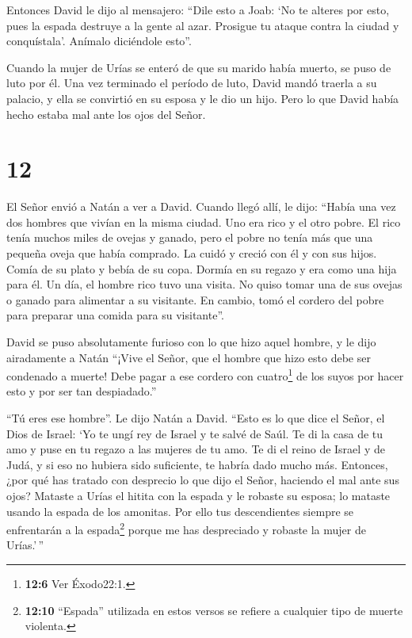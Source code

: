  Entonces David le dijo al mensajero: ``Dile esto a Joab:
`No te alteres por esto, pues la espada destruye a la gente al azar.
Prosigue tu ataque contra la ciudad y conquístala'. Anímalo diciéndole
esto''.

 Cuando la mujer de Urías se enteró de que su marido había
muerto, se puso de luto por él.  Una vez terminado el
período de luto, David mandó traerla a su palacio, y ella se convirtió
en su esposa y le dio un hijo. Pero lo que David había hecho estaba mal
ante los ojos del Señor.

\hypertarget{section-11}{%
\section{12}\label{section-11}}

 El Señor envió a Natán a ver a David. Cuando llegó allí, le
dijo: ``Había una vez dos hombres que vivían en la misma ciudad. Uno era
rico y el otro pobre.  El rico tenía muchos miles de ovejas
y ganado,  pero el pobre no tenía más que una pequeña oveja
que había comprado. La cuidó y creció con él y con sus hijos. Comía de
su plato y bebía de su copa. Dormía en su regazo y era como una hija
para él.  Un día, el hombre rico tuvo una visita. No quiso
tomar una de sus ovejas o ganado para alimentar a su visitante. En
cambio, tomó el cordero del pobre para preparar una comida para su
visitante''.

 David se puso absolutamente furioso con lo que hizo aquel
hombre, y le dijo airadamente a Natán ``¡Vive el Señor, que el hombre
que hizo esto debe ser condenado a muerte!  Debe pagar a ese
cordero con cuatro\footnote{\textbf{12:6} Ver Éxodo22:1.} de los suyos
por hacer esto y por ser tan despiadado.''

 ``Tú eres ese hombre''. Le dijo Natán a David. ``Esto es lo
que dice el Señor, el Dios de Israel: `Yo te ungí rey de Israel y te
salvé de Saúl.  Te di la casa de tu amo y puse en tu regazo
a las mujeres de tu amo. Te di el reino de Israel y de Judá, y si eso no
hubiera sido suficiente, te habría dado mucho más. 
Entonces, ¿por qué has tratado con desprecio lo que dijo el Señor,
haciendo el mal ante sus ojos? Mataste a Urías el hitita con la espada y
le robaste su esposa; lo mataste usando la espada de los amonitas.
 Por ello tus descendientes siempre se enfrentarán a la
espada\footnote{\textbf{12:10} ``Espada'' utilizada en estos versos se
  refiere a cualquier tipo de muerte violenta.} porque me has
despreciado y robaste la mujer de Urías.'\,''

